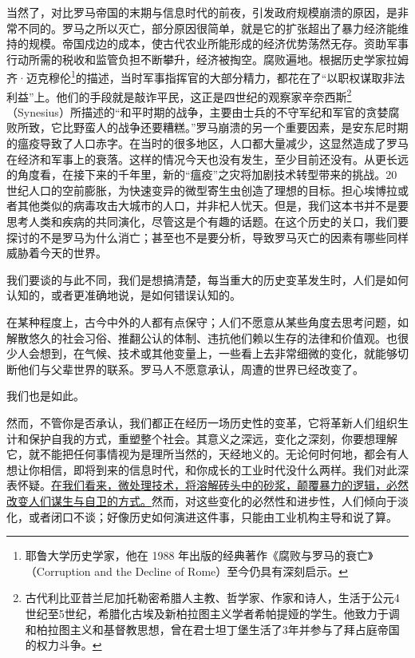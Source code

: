 当然了，对比罗马帝国的末期与信息时代的前夜，引发政府规模崩溃的原因，是非常不同的。罗马之所以灭亡，部分原因很简单，就是它的扩张超出了暴力经济能维持的规模。帝国戍边的成本，使古代农业所能形成的经济优势荡然无存。资助军事行动所需的税收和监管负担不断攀升，经济被掏空。腐败遍地。根据历史学家拉姆齐·迈克穆伦\footnote{耶鲁大学历史学家，他在 1988 年出版的经典著作《腐败与罗马的衰亡》（Corruption and the Decline of Rome）至今仍具有深刻启示。}的描述，当时军事指挥官的大部分精力，都花在了“以职权谋取非法利益”上。他们的手段就是敲诈平民，这正是四世纪的观察家辛奈西斯\footnote{古代利比亚昔兰尼加托勒密希腊人主教、哲学家、作家和诗人，生活于公元4世纪至5世纪，希腊化古埃及新柏拉图主义学者希帕提娅的学生。他致力于调和柏拉图主义和基督教思想，曾在君士坦丁堡生活了3年并参与了拜占庭帝国的权力斗争。}（Synesius）所描述的“和平时期的战争，主要由士兵的不守军纪和军官的贪婪腐败所致，它比野蛮人的战争还要糟糕。”罗马崩溃的另一个重要因素，是安东尼时期的瘟疫导致了人口赤字。在当时的很多地区，人口都大量减少，这显然造成了罗马在经济和军事上的衰落。这样的情况今天也没有发生，至少目前还没有。从更长远的角度看，在接下来的千年里，新的“瘟疫”之灾将加剧技术转型带来的挑战。20 世纪人口的空前膨胀，为快速变异的微型寄生虫创造了理想的目标。担心埃博拉或者其他类似的病毒攻击大城市的人口，并非杞人忧天。但是，我们这本书并不是要思考人类和疾病的共同演化，尽管这是个有趣的话题。在这个历史的关口，我们要探讨的不是罗马为什么消亡；甚至也不是要分析，导致罗马灭亡的因素有哪些同样威胁着今天的世界。

我们要谈的与此不同，我们是想搞清楚，每当重大的历史变革发生时，人们是如何认知的，或者更准确地说，是如何错误认知的。

在某种程度上，古今中外的人都有点保守；人们不愿意从某些角度去思考问题，如解散悠久的社会习俗、推翻公认的体制、违抗他们赖以生存的法律和价值观。也很少人会想到，在气候、技术或其他变量上，一些看上去非常细微的变化，就能够切断他们与父辈世界的联系。罗马人不愿意承认，周遭的世界已经改变了。

我们也是如此。

然而，不管你是否承认，我们都正在经历一场历史性的变革，它将革新人们组织生计和保护自我的方式，重塑整个社会。其意义之深远，变化之深刻，你要想理解它，就不能把任何事情视为是理所当然的，天经地义的。无论何时何地，都会有人想让你相信，即将到来的信息时代，和你成长的工业时代没什么两样。我们对此深表怀疑。\uline{在我们看来，微处理技术，将溶解砖头中的砂浆，颠覆暴力的逻辑，必然改变人们谋生与自卫的方式。}然而，对这些变化的必然性和进步性，人们倾向于淡化，或者闭口不谈；好像历史如何演进这件事，只能由工业机构主导和说了算。

